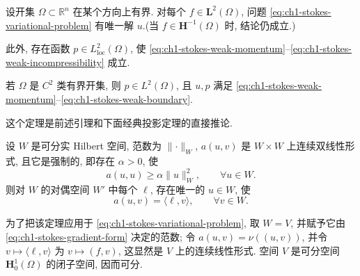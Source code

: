 \begin{Theorem}
\label{thm:ch1-stokes-existence-uniqueness}
设开集 $\Omega\subset\mathbb R^n$ 在某个方向上有界. 对每个 $f\in\mathbf L^2(\Omega)$, 问题 \eqref{eq:ch1-stokes-variational-problem} 有唯一解 $u$.(当 $f\in\mathbf H^{-1}(\Omega)$ 时, 结论仍成立.)

此外, 存在函数 $p\in L^2_{\mathrm{loc}}(\Omega)$, 使 \eqref{eq:ch1-stokes-weak-momentum}--\eqref{eq:ch1-stokes-weak-incompressibility} 成立.

若 $\Omega$ 是 $C^2$ 类有界开集, 则 $p\in L^2(\Omega)$, 且 $u,p$ 满足 \eqref{eq:ch1-stokes-weak-momentum}--\eqref{eq:ch1-stokes-weak-boundary}.
\end{Theorem}

这个定理是前述引理和下面经典投影定理的直接推论.

\begin{Theorem}
\label{thm:ch1-abstract-projection}
设 $W$ 是可分实 Hilbert 空间, 范数为 $\lVert\cdot\rVert_W$, $a(u,v)$ 是 $W\times W$ 上连续双线性形式, 且它是强制的, 即存在 $\alpha>0$, 使
\begin{equation}
a(u,u)\geq\alpha\lVert u\rVert_W^2,\qquad\forall u\in W.
\label{eq:ch1-coercivity}
\end{equation}
则对 $W$ 的对偶空间 $W'$ 中每个 $\ell$, 存在唯一的 $u\in W$, 使
\begin{equation}
a(u,v)=\langle\ell,v\rangle,\qquad\forall v\in W.
\label{eq:ch1-abstract-variational-problem}
\end{equation}
\end{Theorem}

为了把该定理应用于 \eqref{eq:ch1-stokes-variational-problem}, 取 $W=V$, 并赋予它由 \eqref{eq:ch1-stokes-gradient-form} 决定的范数; 令 $a(u,v)=\nu((u,v))$, 并令 $v\mapsto\langle\ell,v\rangle$ 为 $v\mapsto(f,v)$, 这显然是 $V$ 上的连续线性形式. 空间 $V$ 是可分空间 $\mathbf H_0^1(\Omega)$ 的闭子空间, 因而可分.

